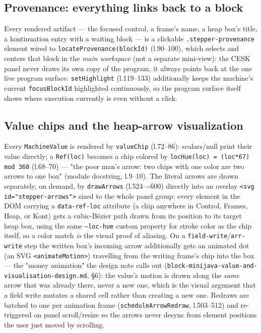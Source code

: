 \documentclass[11pt]{article}
\begin{document}
\subsection{Provenance: everything links back to a block}
\label{sec:provenance}

Every rendered artifact --- the focused control, a frame's name, a heap
box's title, a kontinuation entry with a waiting block --- is a clickable
\texttt{.stepper-provenance} element wired to \texttt{locateProvenance(blockId)}
(l.90--100), which selects and centers that block in the \emph{main
workspace} (not a separate mini-view): the CESK panel never draws its own
copy of the program, it always points back at the one live program surface.
\texttt{setHighlight} (l.119--133) additionally keeps the machine's current
\texttt{focusBlockId} highlighted continuously, so the program surface
itself shows where execution currently is even without a click.

\subsection{Value chips and the heap-arrow visualization}
\label{sec:arrows}

Every \texttt{MachineValue} is rendered by \texttt{valueChip} (l.72--86):
scalars/null print their value directly; a \texttt{Ref(loc)} becomes a
chip colored by \texttt{locHue(loc) = (loc*67) mod 360} (l.68--70) --- "the
poor man's arrow: two chips with one color are two arrows to one box"
(module docstring, l.9--10). The literal arrows are drawn separately, on
demand, by \texttt{drawArrows} (l.524--\textasciitilde 600) directly into
an overlay \texttt{<svg id="stepper-arrows">} sized to the whole panel
group: every element in the DOM carrying a \texttt{data-ref-loc} attribute
(a chip anywhere in Control, Frames, Heap, or Kont) gets a cubic-Bézier
path drawn from its position to its target heap box, using the same
\texttt{--loc-hue} custom property for stroke color as the chip itself, so
a color match \emph{is} the visual proof of aliasing. On a
\texttt{field-write}/\texttt{arr-write} step the written box's incoming
arrow additionally gets an animated dot (an SVG \texttt{<animateMotion>})
travelling from the writing frame's chip into the box --- the "money
animation" the design note calls out (\texttt{block-minijava-value-and-
visualisation-design.md}, \S6): the value's motion is drawn along the
\emph{same} arrow that was already there, never a new one, which is the
visual argument that a field write mutates a shared cell rather than
creating a new one. Redraws are batched to one per animation frame
(\texttt{scheduleArrowRedraw}, l.503--512) and re-triggered on panel
scroll/resize so the arrows never desync from element positions the user
just moved by scrolling.
\end{document}
